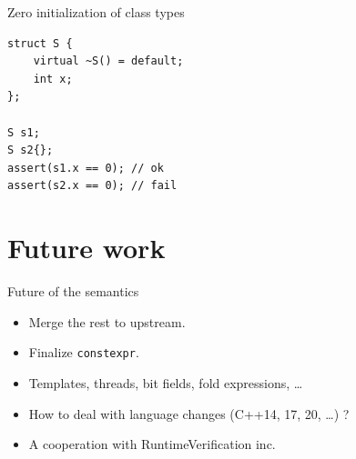 \documentclass[11pt]{beamer}
\begin{document}

\begin{frame}[fragile]{Zero initialization of class types}
\begin{lstlisting}
struct S {
	virtual ~S() = default;
	int x;
};

S s1;
S s2{};
assert(s1.x == 0); // ok
assert(s2.x == 0); // fail
\end{lstlisting}
\end{frame}

%
%


\section{Future work}

\begin{frame}{Future of the semantics}
\begin{itemize}
\pause \item Merge the rest to upstream.
\pause \item Finalize \texttt{constexpr}.
\pause \item Templates, threads, bit fields, fold expressions, \ldots
\pause \item How to deal with language changes (C++14, 17, 20, \ldots) ?
\pause \item A cooperation with RuntimeVerification inc.
\end{itemize}
\end{frame}
\end{document}
